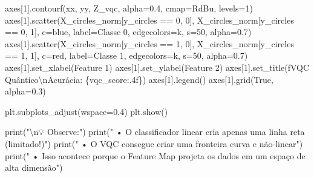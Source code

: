 \documentclass[
  brazilian,
]{report}
\newenvironment{Shaded}{\begin{snugshade}}{\end{snugshade}}
\newcommand{\BuiltInTok}[1]{\textcolor[rgb]{0.00,0.23,0.31}{#1}}
\newcommand{\CharTok}[1]{\textcolor[rgb]{0.13,0.47,0.30}{#1}}
\newcommand{\DecValTok}[1]{\textcolor[rgb]{0.68,0.00,0.00}{#1}}
\newcommand{\FloatTok}[1]{\textcolor[rgb]{0.68,0.00,0.00}{#1}}
\newcommand{\NormalTok}[1]{\textcolor[rgb]{0.00,0.23,0.31}{#1}}
\newcommand{\OperatorTok}[1]{\textcolor[rgb]{0.37,0.37,0.37}{#1}}
\newcommand{\SpecialCharTok}[1]{\textcolor[rgb]{0.37,0.37,0.37}{#1}}
\newcommand{\SpecialStringTok}[1]{\textcolor[rgb]{0.13,0.47,0.30}{#1}}
\newcommand{\StringTok}[1]{\textcolor[rgb]{0.13,0.47,0.30}{#1}}
\newcommand{\VariableTok}[1]{\textcolor[rgb]{0.07,0.07,0.07}{#1}}
\begin{document}
\begin{tcolorbox}
\begin{Shaded}
\begin{Highlighting}[]
\NormalTok{axes[}\DecValTok{1}\NormalTok{].contourf(xx, yy, Z\_vqc, alpha}\OperatorTok{=}\FloatTok{0.4}\NormalTok{, cmap}\OperatorTok{=}\StringTok{\textquotesingle{}RdBu\textquotesingle{}}\NormalTok{, levels}\OperatorTok{=}\DecValTok{1}\NormalTok{)}
\NormalTok{axes[}\DecValTok{1}\NormalTok{].scatter(X\_circles\_norm[y\_circles }\OperatorTok{==} \DecValTok{0}\NormalTok{, }\DecValTok{0}\NormalTok{], X\_circles\_norm[y\_circles }\OperatorTok{==} \DecValTok{0}\NormalTok{, }\DecValTok{1}\NormalTok{], }
\NormalTok{               c}\OperatorTok{=}\StringTok{\textquotesingle{}blue\textquotesingle{}}\NormalTok{, label}\OperatorTok{=}\StringTok{\textquotesingle{}Classe 0\textquotesingle{}}\NormalTok{, edgecolors}\OperatorTok{=}\StringTok{\textquotesingle{}k\textquotesingle{}}\NormalTok{, s}\OperatorTok{=}\DecValTok{50}\NormalTok{, alpha}\OperatorTok{=}\FloatTok{0.7}\NormalTok{)}
\NormalTok{axes[}\DecValTok{1}\NormalTok{].scatter(X\_circles\_norm[y\_circles }\OperatorTok{==} \DecValTok{1}\NormalTok{, }\DecValTok{0}\NormalTok{], X\_circles\_norm[y\_circles }\OperatorTok{==} \DecValTok{1}\NormalTok{, }\DecValTok{1}\NormalTok{], }
\NormalTok{               c}\OperatorTok{=}\StringTok{\textquotesingle{}red\textquotesingle{}}\NormalTok{, label}\OperatorTok{=}\StringTok{\textquotesingle{}Classe 1\textquotesingle{}}\NormalTok{, edgecolors}\OperatorTok{=}\StringTok{\textquotesingle{}k\textquotesingle{}}\NormalTok{, s}\OperatorTok{=}\DecValTok{50}\NormalTok{, alpha}\OperatorTok{=}\FloatTok{0.7}\NormalTok{)}
\NormalTok{axes[}\DecValTok{1}\NormalTok{].set\_xlabel(}\StringTok{\textquotesingle{}Feature 1\textquotesingle{}}\NormalTok{)}
\NormalTok{axes[}\DecValTok{1}\NormalTok{].set\_ylabel(}\StringTok{\textquotesingle{}Feature 2\textquotesingle{}}\NormalTok{)}
\NormalTok{axes[}\DecValTok{1}\NormalTok{].set\_title(}\SpecialStringTok{f\textquotesingle{}VQC Quântico}\CharTok{\textbackslash{}n}\SpecialStringTok{Acurácia: }\SpecialCharTok{\{}\NormalTok{vqc\_score}\SpecialCharTok{:.4f\}}\SpecialStringTok{\textquotesingle{}}\NormalTok{)}
\NormalTok{axes[}\DecValTok{1}\NormalTok{].legend()}
\NormalTok{axes[}\DecValTok{1}\NormalTok{].grid(}\VariableTok{True}\NormalTok{, alpha}\OperatorTok{=}\FloatTok{0.3}\NormalTok{)}

\NormalTok{plt.subplots\_adjust(wspace}\OperatorTok{=}\FloatTok{0.4}\NormalTok{)}
\NormalTok{plt.show()}

\BuiltInTok{print}\NormalTok{(}\StringTok{"}\CharTok{\textbackslash{}n}\StringTok{💡 Observe:"}\NormalTok{)}
\BuiltInTok{print}\NormalTok{(}\StringTok{"   • O classificador linear cria apenas uma linha reta (limitado!)"}\NormalTok{)}
\BuiltInTok{print}\NormalTok{(}\StringTok{"   • O VQC consegue criar uma fronteira curva e não{-}linear"}\NormalTok{)}
\BuiltInTok{print}\NormalTok{(}\StringTok{"   • Isso acontece porque o Feature Map projeta os dados em um espaço de alta dimensão"}\NormalTok{)}
\end{Highlighting}
\end{Shaded}

\end{tcolorbox}
\end{document}
